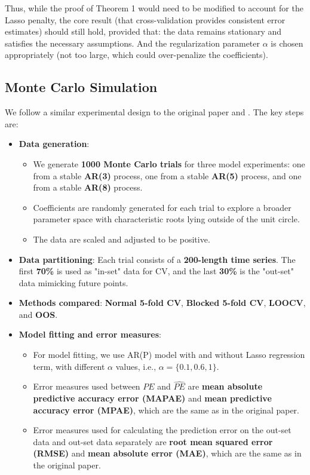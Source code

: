 \documentclass[12pt, oneside]{amsart}
\theoremstyle{definition}
\theoremstyle{remark}
\numberwithin{equation}{section}
\begin{document}
Thus, while the proof of Theorem 1 would need to be modified to account for the Lasso penalty, the core result (that cross-validation provides consistent error estimates) should still hold, provided that: the data remains stationary and satisfies the necessary assumptions. And the regularization parameter $\alpha$ is chosen appropriately (not too large, which could over-penalize the coefficients).

\subsection{Monte Carlo Simulation}
We follow a similar experimental design to the original paper and \citep{Bergmeir2014}. The key steps are:

\begin{itemize}
    \item \textbf{Data generation}:
    \begin{itemize}
        \item We generate \textbf{1000 Monte Carlo trials} for three model experiments: one from a stable \textbf{AR(3)} process, one from a stable \textbf{AR(5)} process, and one from a stable \textbf{AR(8)} process.
        \item Coefficients are randomly generated for each trial to explore a broader parameter space with characteristic roots lying outside of the unit circle. 
        \item The data are scaled and adjusted to be positive.
    \end{itemize}
    \item \textbf{Data partitioning}:
Each trial consists of a \textbf{200-length time series}. The first \textbf{70\%} is used as "in-set" data for CV, and the last \textbf{30\%} is the "out-set" data mimicking future points.

    \item \textbf{Methods compared}:
\textbf{Normal 5-fold CV}, \textbf{Blocked 5-fold CV}, \textbf{LOOCV}, and \textbf{OOS}.
    \item \textbf{Model fitting and error measures}:
    \begin{itemize}
        \item For model fitting, we use AR(P) model with and without Lasso regression term, with different $\alpha$ values, i.e., $\alpha = \{0.1, 0.6, 1\}$.
        \item Error measures used between $PE$ and $\hat{PE}$ are \textbf{mean absolute predictive accuracy error (MAPAE)} and 
        \textbf{mean predictive accuracy error (MPAE)}, which are the same as in the original paper.
        \item Error measures used for calculating the prediction error on the out-set data and out-set data separately are \textbf{root mean squared error (RMSE)} and \textbf{mean absolute error (MAE)}, which are the same as in the original paper. 
    \end{itemize}

\end{itemize}
\end{document}
